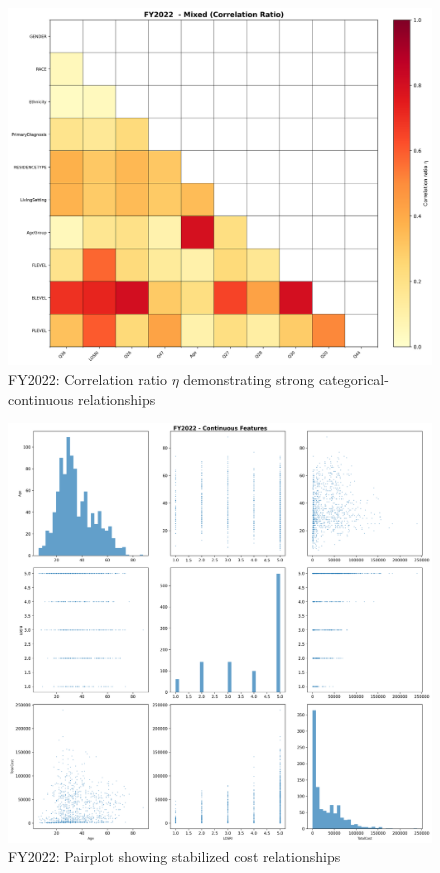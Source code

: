 \newpage

\vspace*{\fill}
\begin{figure}[htbp]
\centering
\includegraphics[width=\textwidth]{fy2022_mixed_correlation_ratio.png}
\caption{FY2022: Correlation ratio $\eta$ demonstrating strong categorical-continuous relationships}
\end{figure}
\vspace*{\fill}

\newpage

\vspace*{\fill}
\begin{figure}[htbp]
\centering
\includegraphics[width=\textwidth]{fy2022_pairplot_top_features.png}
\caption{FY2022: Pairplot showing stabilized cost relationships}
\end{figure}
\vspace*{\fill}

